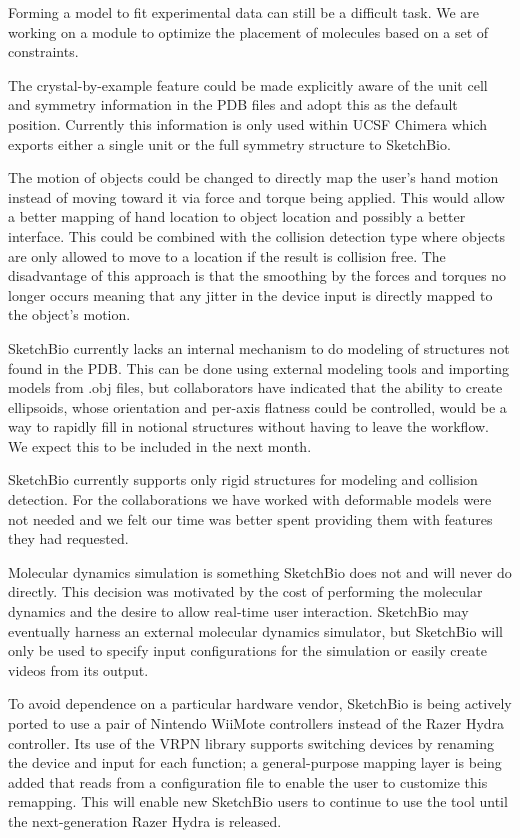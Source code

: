 \documentclass[twocolumn]{bmcart}%
\begin{document}
Forming a model to fit experimental data can still be a difficult task.  We are working on a module to optimize the placement of molecules based on a set of constraints.

The crystal-by-example feature could be made explicitly aware of the unit cell and symmetry information in the PDB files and adopt this as the default position.
Currently this information is only used within UCSF Chimera which exports either a single unit or the full symmetry structure to SketchBio.

The motion of objects could be changed to directly map the user's hand motion instead of moving toward it via force and torque being applied.
This would allow a better mapping of hand location to object location and possibly a better interface.
This could be combined with the collision detection type where objects are only allowed to move to a location if the result is collision free.
The disadvantage of this approach is that the smoothing by the forces and torques no longer occurs meaning that any jitter in the device input is directly mapped to the object's motion.

SketchBio currently lacks an internal mechanism to do modeling of structures not found in the PDB.
This can be done using external modeling tools and importing models from .obj files, but collaborators have indicated that the ability to create ellipsoids, whose orientation and per-axis flatness could be controlled, would be a way to rapidly fill in notional structures without having to leave the workflow.
We expect this to be included in the next month.

SketchBio currently supports only rigid structures for modeling and collision detection.
For the collaborations we have worked with deformable models were not needed and we felt our time was better spent providing them with features they had requested.

Molecular dynamics simulation is something SketchBio does not and will never do directly.
This decision was motivated by the cost of performing the molecular dynamics and the desire to allow real-time user interaction.
SketchBio may eventually harness an external molecular dynamics simulator, but SketchBio will only be used to specify input configurations for the simulation or easily create videos from its output.

To avoid dependence on a particular hardware vendor, SketchBio is being actively ported to use a pair of Nintendo WiiMote controllers instead of the Razer Hydra controller.
Its use of the VRPN library supports switching devices by renaming the device and input for each function; a general-purpose mapping layer is being added that reads from a configuration file to enable the user to customize this remapping.
This will enable new SketchBio users to continue to use the tool until the next-generation Razer Hydra is released.
\end{document}
